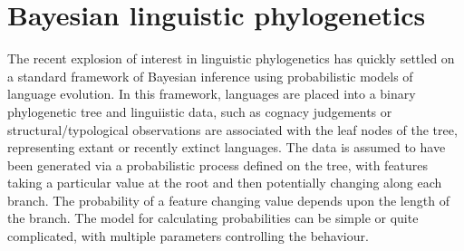 \documentclass[twocolumn,10pt]{scrartcl}
\begin{document}


\section{Bayesian linguistic phylogenetics}

The recent explosion of interest in linguistic phylogenetics has quickly settled on a standard framework of Bayesian inference using probabilistic models of language evolution.  In this framework, languages are placed into a binary phylogenetic tree and linguiistic data, such as cognacy judgements or structural/typological observations are associated with the leaf nodes of the tree, representing extant or recently extinct languages.  The data is assumed to have been generated via a probabilistic process defined on the tree, with features taking a particular value at the root and then potentially changing along each branch.  The probability of a feature changing value depends upon the length of the branch.  The model for calculating probabilities can be simple or quite complicated, with multiple parameters controlling the behaviour.
\end{document}

